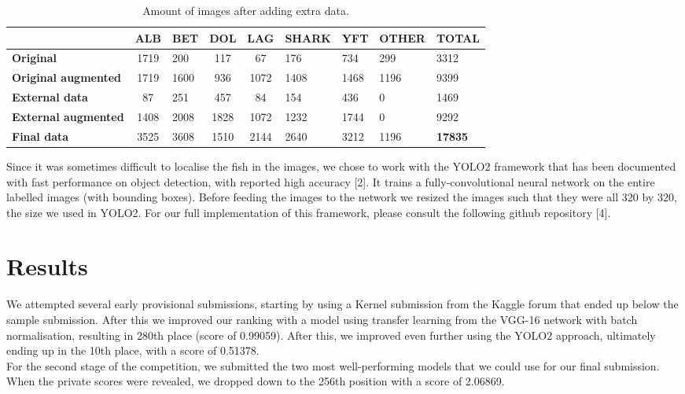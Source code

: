 \documentclass[a4paper]{article}
\begin{document}
\begin{table}[]
\centering
\label{my-label}
\begin{tabular}{|l|c|l|c|c|l|l|l|l|}
\hline
 & \textbf{ALB} & \textbf{BET} & \textbf{DOL} & \textbf{LAG} & \textbf{SHARK}  & \textbf{YFT} & \textbf{OTHER} & \textbf{TOTAL} \\ \hline
\textbf{Original} & 1719          & 200  & 117   &  67 & 176 & 734 & 299 & 3312 \\ \hline
\textbf{Original augmented} & 1719      & 1600 &  936 &  1072 & 1408 & 1468 & 1196 & 9399 \\ \hline
\textbf{External data} &  87  & 251 &  457  & 84  & 154 & 436 & 0 & 1469 \\ \hline
\textbf{External augmented} & 1408  & 2008 & 1828  & 1072   & 1232 & 1744 & 0 & 9292 \\ \hline
\textbf{Final data} & 3525 & 3608 & 1510 & 2144 & 2640 & 3212 & 1196 & \textbf{17835} \\ \hline
\end{tabular}
\caption{Amount of images after adding extra data. }
\end{table}


Since it was sometimes difficult to localise the fish in the images, we chose to work with the YOLO2 framework that has been documented with fast performance on object detection, with reported high accuracy [2]. It trains a fully-convolutional neural network on the entire labelled images (with bounding boxes). Before feeding the images to the network we resized the images such that they were all 320 by 320, the size we used in YOLO2. For our full implementation of this framework, please consult the following github repository [4].


\section{Results}

We attempted several early provisional submissions, starting by using a Kernel submission from the Kaggle forum that ended up below the sample submission. After this we improved our ranking with a model using transfer learning from the VGG-16 network with batch normalisation, resulting in 280th place (score of 0.99059). After this, we improved even further using the YOLO2 approach, ultimately ending up in the 10th place, with a score of 0.51378.\\ 
For the second stage of the competition, we submitted the two most well-performing models that we could use for our final submission. When the private scores were revealed, we dropped down to the 256th position with a score of 2.06869.
\end{document}
